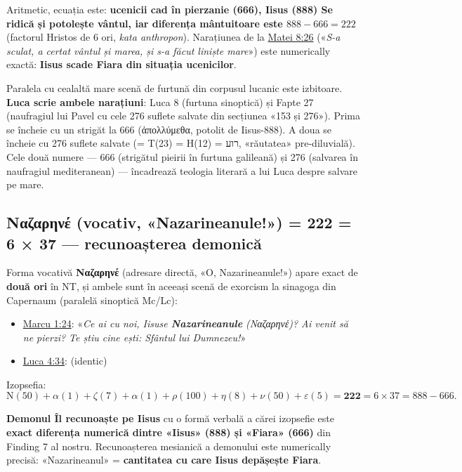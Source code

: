 \documentclass[12pt,a4paper,twoside,openany]{book}
\begin{document}
Aritmetic, ecuația este: \textbf{ucenicii cad în pierzanie (666), Iisus (888) Se ridică și potolește vântul, iar diferența mântuitoare este $888 - 666 = 222$} (factorul Hristos de 6 ori, \textit{kata anthropon}). Narațiunea de la \href{https://bibliaortodoxa.ro/carte.php?id=55\&cap=8\#26}{Matei 8:26} («\textit{S-a sculat, a certat vântul și marea, și s-a făcut liniște mare}») este numerically exactă: \textbf{Iisus scade Fiara din situația ucenicilor}.

Paralela cu cealaltă mare scenă de furtună din corpusul lucanic este izbitoare. \textbf{Luca scrie ambele narațiuni}: Luca 8 (furtuna sinoptică) și Fapte 27 (naufragiul lui Pavel cu cele 276 suflete salvate din secțiunea «153 și 276»). Prima se încheie cu un strigăt la 666 (ἀπολλύμεθα, potolit de Iisus-888). A doua se încheie cu 276 suflete salvate (= T(23) = H(12) = רוע, «răutatea» pre-diluvială). Cele două numere — 666 (strigătul pieirii în furtuna galileană) și 276 (salvarea în naufragiul mediteranean) — încadrează teologia literară a lui Luca despre salvare pe mare.

\subsection{\texorpdfstring{Ναζαρηνέ}{Nazarene} (vocativ, «Nazarineanule!») = 222 = 6 × 37 — recunoașterea demonică}
\label{sec:nazarene}

Forma vocativă \textbf{Ναζαρηνέ} (adresare directă, «O, Nazarineanule!») apare exact de \textbf{două ori} în NT, și ambele sunt în aceeași scenă de exorcism la sinagoga din Capernaum (paralelă sinoptică Mc/Lc):

\begin{itemize}
  \item \href{https://bibliaortodoxa.ro/carte.php?id=53\&cap=1\#24}{Marcu 1:24}: «\textit{Ce ai cu noi, Iisuse \textbf{Nazarineanule} (Ναζαρηνέ)? Ai venit să ne pierzi? Te știu cine ești: Sfântul lui Dumnezeu!}»
  \item \href{https://bibliaortodoxa.ro/carte.php?id=48\&cap=4\#34}{Luca 4:34}: (identic)
\end{itemize}

Izopsefia:
\[
\mathrm{N}(50) + \alpha(1) + \zeta(7) + \alpha(1) + \rho(100) + \eta(8) + \nu(50) + \varepsilon(5) = \mathbf{222} = 6 \times 37 = 888 - 666.
\]

\textbf{Demonul Îl recunoaște pe Iisus} cu o formă verbală a cărei izopsefie este \textbf{exact diferența numerică dintre «Iisus» (888) și «Fiara» (666)} din Finding 7 al nostru. Recunoașterea mesianică a demonului este numerically precisă: «Nazarineanul» = \textbf{cantitatea cu care Iisus depășește Fiara}.
\end{document}

